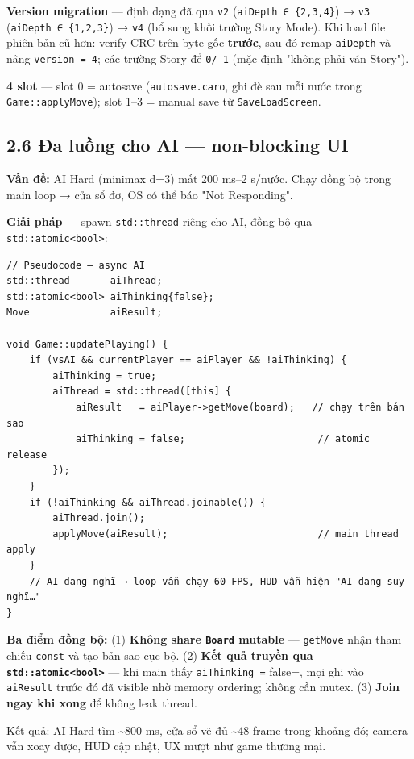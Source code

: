 \documentclass[11pt,a4paper]{article}
\begin{document}
\textbf{Version migration} — định dạng đã qua \texttt{v2} (\texttt{aiDepth ∈ \{2,3,4\}}) → \texttt{v3} (\texttt{aiDepth ∈ \{1,2,3\}}) → \texttt{v4} (bổ sung khối trường Story Mode). Khi load file phiên bản cũ hơn: verify CRC trên byte gốc \textbf{trước}, sau đó remap \texttt{aiDepth} và nâng \texttt{version = 4}; các trường Story để \texttt{0/-1} (mặc định "không phải ván Story").

\textbf{4 slot} — slot 0 = autosave (\texttt{autosave.caro}, ghi đè sau mỗi nước trong \texttt{Game::applyMove}); slot 1–3 = manual save từ \texttt{SaveLoadScreen}.
\subsection{2.6 Đa luồng cho AI — non-blocking UI}
\label{sec:org3ffe0e4}

\textbf{Vấn đề:} AI Hard (minimax d=3) mất 200 ms–2 s/nước. Chạy đồng bộ trong main loop → cửa sổ đơ, OS có thể báo "Not Responding".

\textbf{Giải pháp} — spawn \texttt{std::thread} riêng cho AI, đồng bộ qua \texttt{std::atomic<bool>}:

\begin{verbatim}
// Pseudocode — async AI
std::thread       aiThread;
std::atomic<bool> aiThinking{false};
Move              aiResult;

void Game::updatePlaying() {
    if (vsAI && currentPlayer == aiPlayer && !aiThinking) {
        aiThinking = true;
        aiThread = std::thread([this] {
            aiResult   = aiPlayer->getMove(board);   // chạy trên bản sao
            aiThinking = false;                       // atomic release
        });
    }
    if (!aiThinking && aiThread.joinable()) {
        aiThread.join();
        applyMove(aiResult);                          // main thread apply
    }
    // AI đang nghĩ → loop vẫn chạy 60 FPS, HUD vẫn hiện "AI đang suy nghĩ…"
}
\end{verbatim}

\textbf{Ba điểm đồng bộ:} (1) \textbf{Không share \texttt{Board} mutable} — \texttt{getMove} nhận tham chiếu \texttt{const} và tạo bản sao cục bộ. (2) \textbf{Kết quả truyền qua \texttt{std::atomic<bool>}} — khi main thấy \texttt{aiThinking =} false=, mọi ghi vào \texttt{aiResult} trước đó đã visible nhờ memory ordering; không cần mutex. (3) \textbf{Join ngay khi xong} để không leak thread.

Kết quả: AI Hard tìm \textasciitilde{}800 ms, cửa sổ vẽ đủ \textasciitilde{}48 frame trong khoảng đó; camera vẫn xoay được, HUD cập nhật, UX mượt như game thương mại.
\end{document}
